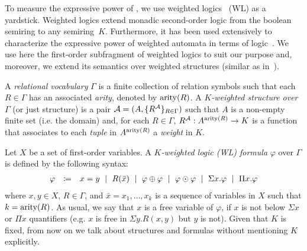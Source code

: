 To measure the expressive power of \langprod, we use weighted logics~\cite{DrosteG05} (WL) as a yardstick. Weighted logics extend monadic second-order logic from the boolean semiring to any semiring~$K$. Furthermore, it has been used extensively to characterize the expressive power of weighted automata in terms of logic~\cite{droste2009handbook}. We use here the first-order subfragment of weighted logics to suit our purpose and, moreover, we extend its semantics over weighted structures (similar as in~\cite{GradelV17}).

A \textit{relational vocabulary} $\Gamma$ is a finite collection of relation symbols such that each $R \in \Gamma$ has an associated \textit{arity}, denoted by $\operatorname{arity}(R)$.
A \textit{$K$-weighted structure over $\Gamma$} (or just structure) is a pair $\mathcal{A} = (A, \{R^{\mathcal{A}}\}_{R \in \Gamma})$ such that $A$ is a non-empty finite set (i.e. the domain) and, for each $R \in \Gamma$, $R^{\mathcal{A}}: A^{\operatorname{arity}(R)} \rightarrow K$ is a function that associates to each \textit{tuple} in $A^{\operatorname{arity}(R)}$ a \textit{weight} in $K$.

Let $X$ be a set of first-order variables. A \textit{$K$-weighted logic (WL) formula} $\varphi$ over $\Gamma$ is defined by the following syntax:
$$
\begin{array}{rcl}
\varphi & \coloneqq  & x = y \ \mid \ R(\bar{x}) \ \mid \ \varphi \ksum \varphi \ \mid \ \varphi \kprod \varphi \ \mid \ \Sigma x. \varphi \ \mid \ \Pi x. \varphi
\end{array}
$$ 
where $x, y \in X$, $R \in \Gamma$, and $\bar{x} = x_1, \ldots, x_k$ is a sequence of variables in $X$ such that $k=\operatorname{arity}(R)$. As usual, we say that $x$ is a free variable of $\varphi$, if $x$ is not below $\Sigma x$ or $\Pi x$ quantifiers (e.g. $x$ is free in $\Sigma y. R(x,y)$ but $y$ is not). 
Given that $K$ is fixed, from now on we talk about structures and formulas without mentioning $K$ explicitly.  

